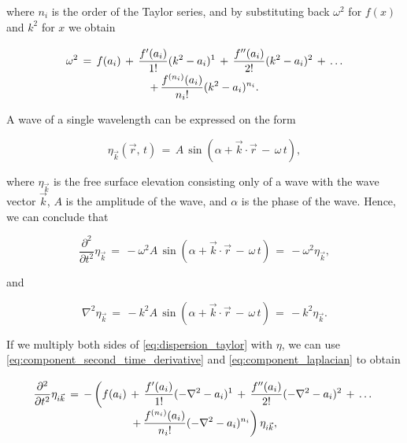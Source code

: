 where $n_i$ is the order of the Taylor series, and by substituting back $\omega^2$ for $f(x)$ and $k^2$ for $x$ we obtain

\begin{equation} \label{eq:dispersion_taylor}
\renewcommand*{\arraystretch}{2}
\begin{array}{c}
\displaystyle \omega^2 \,=\, f(a_i) \,+\, \frac{f'(a_i)}{1!}(k^2-a_i)^1 \,+\, \frac{f''(a_i)}{2!}(k^2-a_i)^2 \,+\, \dots \\
\displaystyle +\, \frac{f^{(n_i)}(a_i)}{n_i!}(k^2-a_i)^{n_i}.
\end{array}
\end{equation}

A wave of a single wavelength can be expressed on the form

\begin{equation} \label{eq:component_sin}
\eta_{\vec{k}}(\vec{r},\,t) \,=\, A\,\sin(\alpha + \vec{k}\cdot\vec{r}\,-\,\omega\,t),
\end{equation}

where $\eta_{\vec{k}}$ is the free surface elevation consisting only of a wave with the wave vector $\vec{k}$, $A$ is the amplitude of the wave, and $\alpha$ is the phase of the wave. Hence, we can conclude that

\begin{equation} \label{eq:component_second_time_derivative}
\frac{\partial^2}{\partial t^2}\eta_{\vec{k}} \,=\, -\omega^2 A\,\sin(\alpha + \vec{k}\cdot\vec{r}\,-\,\omega\,t) \,=\, -\omega^2\eta_{\vec{k}},
\end{equation}

and 

\begin{equation} \label{eq:component_laplacian}
\nabla^2\eta_{\vec{k}} \,=\, -k^2 A\,\sin(\alpha + \vec{k}\cdot\vec{r}\,-\,\omega\,t) \,=\, -k^2\eta_{\vec{k}}.
\end{equation}

If we multiply both sides of \eqref{eq:dispersion_taylor} with $\eta$, we can use \eqref{eq:component_second_time_derivative} and \eqref{eq:component_laplacian} to obtain

\begin{equation} \label{eq:taylor_pde}
\renewcommand*{\arraystretch}{2}
\begin{array}{c}
\displaystyle \frac{\partial^2}{\partial t^2}\eta_{i\vec{k}} \,=\, -\left(f(a_i) \,+\, \frac{f'(a_i)}{1!}(-\nabla^2-a_i)^1 \,+\, \frac{f''(a_i)}{2!}(-\nabla^2-a_i)^2 \,+\, \dots \right.\\
\displaystyle \left. +\, \frac{f^{(n_i)}(a_i)}{n_i!}(-\nabla^2-a_i)^{n_i}\right)\eta_{i\vec{k}},
\end{array}
\end{equation}

